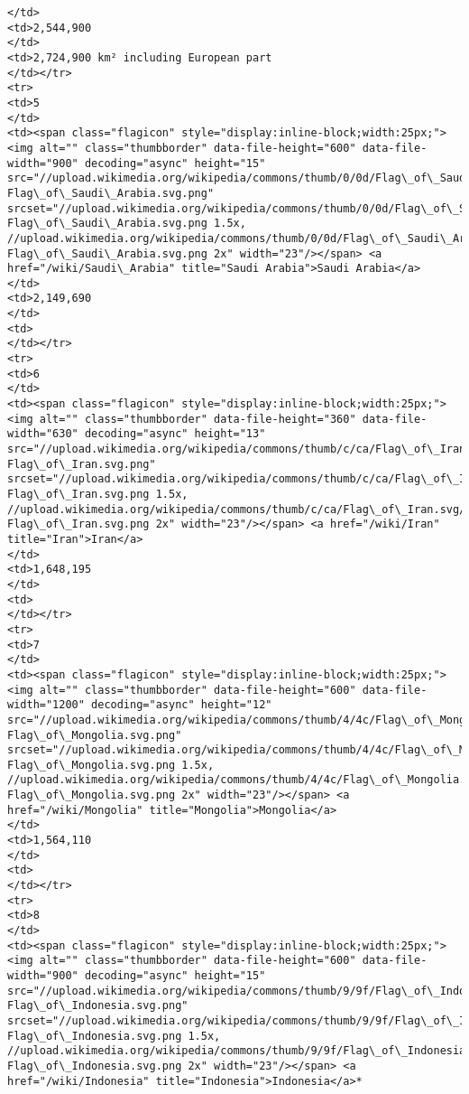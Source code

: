 \documentclass[11pt]{article}
\begin{document}
\begin{Verbatim}[commandchars=\\\{\}]
</td>
<td>2,544,900
</td>
<td>2,724,900 km² including European part
</td></tr>
<tr>
<td>5
</td>
<td><span class="flagicon" style="display:inline-block;width:25px;"><img alt="" class="thumbborder" data-file-height="600" data-file-width="900" decoding="async" height="15" src="//upload.wikimedia.org/wikipedia/commons/thumb/0/0d/Flag\_of\_Saudi\_Arabia.svg/23px-Flag\_of\_Saudi\_Arabia.svg.png" srcset="//upload.wikimedia.org/wikipedia/commons/thumb/0/0d/Flag\_of\_Saudi\_Arabia.svg/35px-Flag\_of\_Saudi\_Arabia.svg.png 1.5x, //upload.wikimedia.org/wikipedia/commons/thumb/0/0d/Flag\_of\_Saudi\_Arabia.svg/45px-Flag\_of\_Saudi\_Arabia.svg.png 2x" width="23"/></span> <a href="/wiki/Saudi\_Arabia" title="Saudi Arabia">Saudi Arabia</a>
</td>
<td>2,149,690
</td>
<td>
</td></tr>
<tr>
<td>6
</td>
<td><span class="flagicon" style="display:inline-block;width:25px;"><img alt="" class="thumbborder" data-file-height="360" data-file-width="630" decoding="async" height="13" src="//upload.wikimedia.org/wikipedia/commons/thumb/c/ca/Flag\_of\_Iran.svg/23px-Flag\_of\_Iran.svg.png" srcset="//upload.wikimedia.org/wikipedia/commons/thumb/c/ca/Flag\_of\_Iran.svg/35px-Flag\_of\_Iran.svg.png 1.5x, //upload.wikimedia.org/wikipedia/commons/thumb/c/ca/Flag\_of\_Iran.svg/46px-Flag\_of\_Iran.svg.png 2x" width="23"/></span> <a href="/wiki/Iran" title="Iran">Iran</a>
</td>
<td>1,648,195
</td>
<td>
</td></tr>
<tr>
<td>7
</td>
<td><span class="flagicon" style="display:inline-block;width:25px;"><img alt="" class="thumbborder" data-file-height="600" data-file-width="1200" decoding="async" height="12" src="//upload.wikimedia.org/wikipedia/commons/thumb/4/4c/Flag\_of\_Mongolia.svg/23px-Flag\_of\_Mongolia.svg.png" srcset="//upload.wikimedia.org/wikipedia/commons/thumb/4/4c/Flag\_of\_Mongolia.svg/35px-Flag\_of\_Mongolia.svg.png 1.5x, //upload.wikimedia.org/wikipedia/commons/thumb/4/4c/Flag\_of\_Mongolia.svg/46px-Flag\_of\_Mongolia.svg.png 2x" width="23"/></span> <a href="/wiki/Mongolia" title="Mongolia">Mongolia</a>
</td>
<td>1,564,110
</td>
<td>
</td></tr>
<tr>
<td>8
</td>
<td><span class="flagicon" style="display:inline-block;width:25px;"><img alt="" class="thumbborder" data-file-height="600" data-file-width="900" decoding="async" height="15" src="//upload.wikimedia.org/wikipedia/commons/thumb/9/9f/Flag\_of\_Indonesia.svg/23px-Flag\_of\_Indonesia.svg.png" srcset="//upload.wikimedia.org/wikipedia/commons/thumb/9/9f/Flag\_of\_Indonesia.svg/35px-Flag\_of\_Indonesia.svg.png 1.5x, //upload.wikimedia.org/wikipedia/commons/thumb/9/9f/Flag\_of\_Indonesia.svg/45px-Flag\_of\_Indonesia.svg.png 2x" width="23"/></span> <a href="/wiki/Indonesia" title="Indonesia">Indonesia</a>*

\end{Verbatim}
\end{document}
